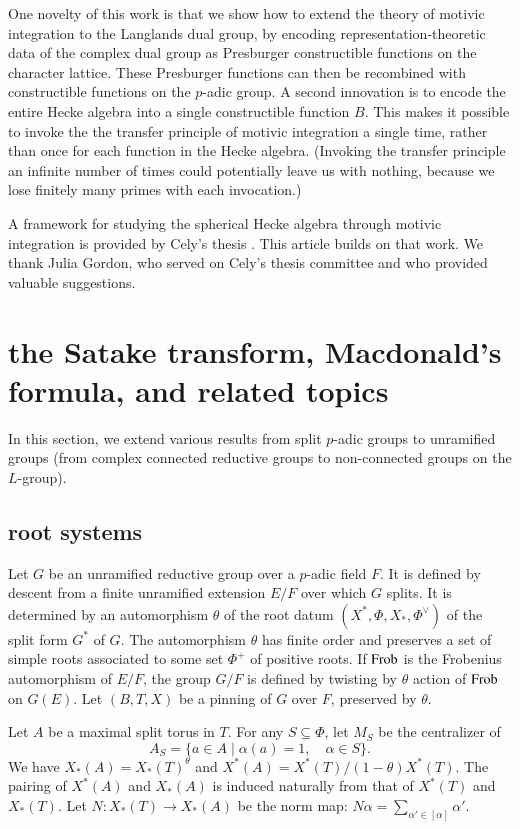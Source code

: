 One novelty of this work is that we show how to extend the theory of motivic integration to the Langlands
dual group, by encoding representation-theoretic data of the complex dual group as Presburger constructible functions on the character lattice. These
Presburger functions can then be recombined with constructible functions on the $p$-adic group.  A second innovation is
to encode the entire Hecke algebra into a single constructible function $B$.  This makes it possible to invoke the the transfer
principle of motivic integration a single time, rather than once for each function in the Hecke algebra.  (Invoking the transfer principle
an infinite number of times could potentially leave us with nothing, because we lose finitely many primes with each invocation.)

A framework for studying the spherical Hecke algebra through motivic integration is provided by Cely's thesis \cite{cely}.
This article builds on that work.  We thank Julia Gordon, who served on Cely's thesis committee and who provided valuable suggestions.



\section{the Satake transform, Macdonald's formula, and related topics}

In this section, we extend various results from split $p$-adic groups to unramified groups
(from
complex connected reductive groups to non-connected groups on the $L$-group).

\subsection{root systems}

Let $G$ be an unramified reductive group over a $p$-adic field $F$.  It is defined by
descent from a finite unramified extension $E/F$ over which $G$ splits.  It is determined by an automorphism
$\theta$ of the root datum $(X^*,\Phi,X_*,\Phi^\vee)$ of the split form $G^*$ of $G$.     
The automorphism $\theta$
has finite order and preserves a set of simple roots associated to some set $\Phi^+$ of positive roots.
If ${\operatorname{Frob}}$ is the Frobenius automorphism of $E/F$, the group $G/F$ is defined by twisting by $\theta$
action of ${\operatorname{Frob}}$ on $G(E)$.
Let $(B,T,X)$ be a pinning of $G$ over $F$, preserved by $\theta$.

Let $A$ be a maximal split torus in $T$.
For any $S\subseteq \Phi$,
let $M_S$
be the centralizer of 
\[
A_S = \{a\in A\mid \alpha(a)=1,\quad \alpha\in S\}.
\]
We have
$X_*(A) = X_*(T)^\theta$ and $X^*(A) = X^*(T)/(1-\theta)X^*(T)$.
The pairing of $X^*(A)$ and $X_*(A)$ is induced naturally from that of $X^*(T)$ and $X_*(T)$.
Let $N:X_*(T)\to X_*(A)$ be the norm map: $N\alpha = \sum_{\alpha'\in [\alpha]} \alpha'$.


